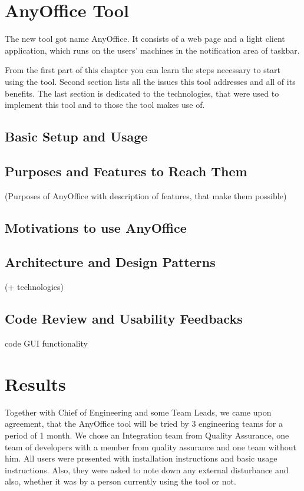 \documentclass[11pt,singleside]{myfithesis2}
\begin{document}
\chapter{AnyOffice Tool}

The new tool got name AnyOffice. It consists of a web page and a light client application, which runs on the users' machines in the notification area of taskbar.

From the first part of this chapter you can learn the steps necessary to start using the tool. Second section lists all the issues this tool addresses and all of its benefits. The last section is dedicated to the technologies, that were used to implement this tool and to those the tool makes use of.


	\section{Basic Setup and Usage}



	\section{Purposes and Features to Reach Them}
(Purposes of AnyOffice with description of features, that make them possible)


	\section{Motivations to use AnyOffice}

	
	\section{Architecture and Design Patterns}
	(+ technologies)
	
	\section{Code Review and Usability Feedbacks}

code
GUI
functionality


\chapter{Results}\label{results}
Together with Chief of Engineering and some Team Leads, we came upon agreement, that the AnyOffice tool will be tried by 3 engineering teams for a period of 1 month. We chose an Integration team from Quality Assurance, one team of developers with a member from quality assurance and one team without him. All users were presented with installation instructions and basic usage instructions. Also, they were asked to note down any external disturbance and also, whether it was by a person currently using the tool or not.
\end{document}
